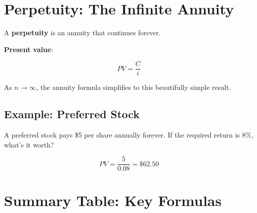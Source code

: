 \documentclass[
  letterpaper,
]{scrbook}
\begin{document}
\FloatBarrier

\section{Perpetuity: The Infinite
Annuity}\label{perpetuity-the-infinite-annuity}

\begin{tcolorbox}[enhanced jigsaw, toptitle=1mm, colbacktitle=quarto-callout-note-color!10!white, opacityback=0, leftrule=.75mm, breakable, colframe=quarto-callout-note-color-frame, toprule=.15mm, opacitybacktitle=0.6, coltitle=black, bottomrule=.15mm, colback=white, arc=.35mm, titlerule=0mm, rightrule=.15mm, left=2mm, title=\textcolor{quarto-callout-note-color}{\faInfo}\hspace{0.5em}{Definition: Perpetuity}, bottomtitle=1mm]

A \textbf{perpetuity} is an annuity that continues forever.

\textbf{Present value}:

\[
PV = \frac{C}{i}
\]

As \(n \to \infty\), the annuity formula simplifies to this beautifully
simple result.

\end{tcolorbox}

\subsection{Example: Preferred Stock}\label{example-preferred-stock}

A preferred stock pays \$5 per share annually forever. If the required
return is 8\%, what's it worth?

\[
PV = \frac{5}{0.08} = \$62.50
\]

\section{Summary Table: Key Formulas}\label{summary-table-key-formulas}
\end{document}
